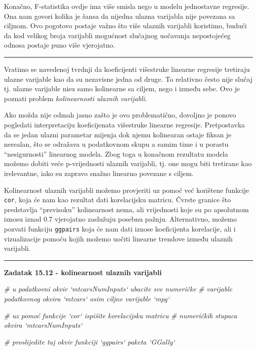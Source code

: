 \documentclass[]{book}
\newenvironment{Shaded}{\begin{snugshade}}{\end{snugshade}}
\newcommand{\CommentTok}[1]{\textcolor[rgb]{0.56,0.35,0.01}{\textit{#1}}}
\theoremstyle{definition}
\theoremstyle{definition}
\theoremstyle{definition}
\theoremstyle{remark}
\begin{document}
Konačno, F-statistika ovdje ima više smisla nego u modelu jednostavne
regresije. Ona nam govori kolika je šansa da nijedna ulazna varijabla
nije povezana sa ciljnom. Ovo pogotovo postaje važno što više ulaznih
varijabli koristimo, budući da kod velikog broja varijabli mogućnost
slučajnog uočavanja nepostojećeg odnosa postaje puno više vjerojatno.

\begin{center}\rule{0.5\linewidth}{\linethickness}\end{center}

Vratimo se navedenoj tvrdnji da koeficijenti višestruke linearne
regresije tretiraju ulazne varijable kao da su nezavisne jedna od druge.
To relativno često nije slučaj tj. ulazne varijable nisu samo kolinearne
sa ciljem, nego i između sebe. Ovo je poznati problem
\emph{kolinearnosti ulaznih varijabli}.

Ako možda nije odmah jasno zašto je ovo problematično, dovoljno je
ponovo pogledati interpretaciju koeficijenata višestruke linearne
regresije. Pretpostavka da se jedan ulazni parametar mijenja dok njemu
kolinearan ostaje fiksan je nerealan, što se odražava u podatkovnom
skupu a samim time i u porastu ``nesigurnosti'' linearnog modela. Zbog
toga u konačnom rezultatu modela možemo dobiti veće p-vrijednosti
ulaznih varijabli, tj. one mogu biti tretirane kao irelevantne, iako su
zapravo snažno linearno povezane s ciljem.

Kolinearnost ulaznih varijabli možemo provjeriti uz pomoć već korištene
funkcije \texttt{cor}, koja će nam kao rezultat dati korelacijsku
matricu. Čvrste granice što predstavlja ``previsoku'' kolinearnost nema,
ali vrijednosti koje su po apsolutnom iznosu iznad 0.7 vjerojatno
zaslužuju posebnu pažnju. Alternativno, možemo pozvati funkciju
\texttt{ggpairs} koja će nam dati iznose koeficijenta korelacije, ali i
vizualizacije pomoću kojih možemo uočiti linearne trendove između
ulaznih varijabli.

\begin{center}\rule{0.5\linewidth}{\linethickness}\end{center}

\textbf{Zadatak 15.12 - kolinearnost ulaznih varijabli}

\begin{Shaded}
\begin{Highlighting}[]
\CommentTok{# u podatkovni okvir `mtcarsNumInputs` ubacite sve numeričke}
\CommentTok{# varijable podatkovnog okvira `mtcars` osim ciljne varijable `mpg`}

\CommentTok{# uz pomoć funkcije `cor` ispišite korelacijsku matricu}
\CommentTok{# numeričkih stupaca okvira `mtcarsNumInputs`}

\CommentTok{# proslijedite taj okvir funkciji `ggpairs` paketa `GGally`}
\end{Highlighting}
\end{Shaded}
\end{document}
